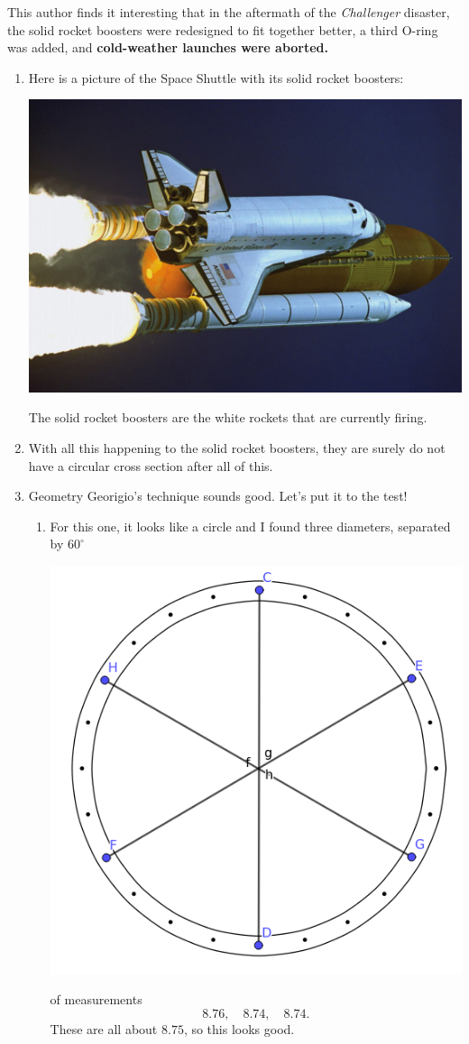 \documentclass[nooutcomes,noauthor,hints,handout]{ximera}
\begin{document}
\begin{question}
  This author finds it interesting that in the aftermath of the
  \textit{Challenger} disaster, the solid rocket boosters were
  redesigned to fit together better, a third O-ring was added, and
  \textbf{cold-weather launches were aborted.}


  \begin{freeResponse}
    \begin{enumerate}
    \item Here is a picture of the Space Shuttle with its solid rocket boosters:
      \begin{center}
        \includegraphics[width=.4\textwidth]{shuttleWithSRB.jpg}
      \end{center}
      The solid rocket boosters are the white rockets that are currently firing.
    \item With all this happening to the solid rocket boosters, they
      are surely do not have a circular cross section after all of
      this.
    \item Geometry Georigio's technique sounds good. Let's put it to the test!
      \begin{enumerate}
      \item For this one, it looks like a circle and I found three
        diameters, separated by $60^\circ$
        \begin{center}
          \includegraphics[width=.4\textwidth]{circleGGMeasured.png}
        \end{center}
        of measurements
        \[
        8.76,\quad 8.74,\quad 8.74.
        \]
        These are all about $8.75$, so this looks good.


\end{enumerate}
\end{enumerate}
\end{freeResponse}
\end{question}
\end{document}
